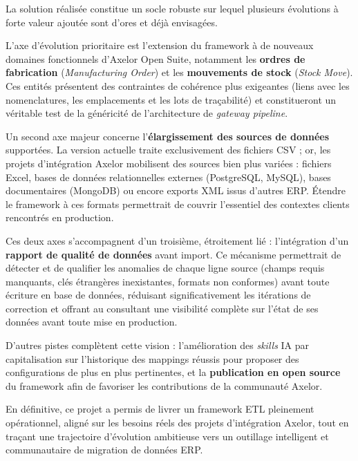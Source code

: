 La solution réalisée constitue un socle robuste sur lequel plusieurs évolutions à forte valeur ajoutée sont d'ores et déjà envisagées.

L'axe d'évolution prioritaire est l'extension du framework à de nouveaux domaines fonctionnels d'Axelor Open Suite, notamment les \textbf{ordres de fabrication} (\textit{Manufacturing Order}) et les \textbf{mouvements de stock} (\textit{Stock Move}). Ces entités présentent des contraintes de cohérence plus exigeantes (liens avec les nomenclatures, les emplacements et les lots de traçabilité) et constitueront un véritable test de la généricité de l'architecture de \textit{gateway pipeline}.

Un second axe majeur concerne l'\textbf{élargissement des sources de données} supportées. La version actuelle traite exclusivement des fichiers CSV ; or, les projets d'intégration Axelor mobilisent des sources bien plus variées : fichiers Excel, bases de données relationnelles externes (PostgreSQL, MySQL), bases documentaires (MongoDB) ou encore exports XML issus d'autres ERP. Étendre le framework à ces formats permettrait de couvrir l'essentiel des contextes clients rencontrés en production.

Ces deux axes s'accompagnent d'un troisième, étroitement lié : l'intégration d'un \textbf{rapport de qualité de données} avant import. Ce mécanisme permettrait de détecter et de qualifier les anomalies de chaque ligne source (champs requis manquants, clés étrangères inexistantes, formats non conformes) avant toute écriture en base de données, réduisant significativement les itérations de correction et offrant au consultant une visibilité complète sur l'état de ses données avant toute mise en production.

D'autres pistes complètent cette vision : l'amélioration des \textit{skills} IA par capitalisation sur l'historique des mappings réussis pour proposer des configurations de plus en plus pertinentes, et la \textbf{publication en open source} du framework afin de favoriser les contributions de la communauté Axelor.

\vspace{0.5cm}

En définitive, ce projet a permis de livrer un framework ETL pleinement opérationnel, aligné sur les besoins réels des projets d'intégration Axelor, tout en traçant une trajectoire d'évolution ambitieuse vers un outillage intelligent et communautaire de migration de données ERP.
